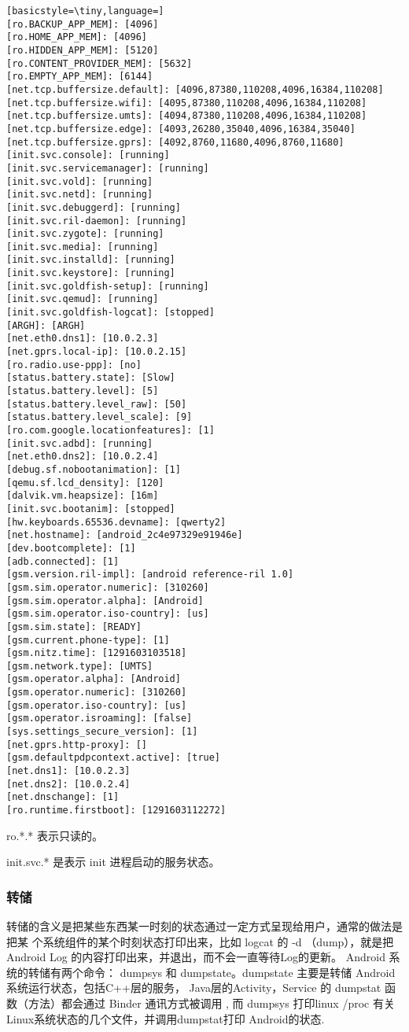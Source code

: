 \documentclass[a4paper,titlepage]{article}
\begin{document}
\begin{multicols}{2}
\begin{lstlisting}[basicstyle=\tiny,language=]
[ro.BACKUP_APP_MEM]: [4096]
[ro.HOME_APP_MEM]: [4096]
[ro.HIDDEN_APP_MEM]: [5120]
[ro.CONTENT_PROVIDER_MEM]: [5632]
[ro.EMPTY_APP_MEM]: [6144]
[net.tcp.buffersize.default]: [4096,87380,110208,4096,16384,110208]
[net.tcp.buffersize.wifi]: [4095,87380,110208,4096,16384,110208]
[net.tcp.buffersize.umts]: [4094,87380,110208,4096,16384,110208]
[net.tcp.buffersize.edge]: [4093,26280,35040,4096,16384,35040]
[net.tcp.buffersize.gprs]: [4092,8760,11680,4096,8760,11680]
[init.svc.console]: [running]
[init.svc.servicemanager]: [running]
[init.svc.vold]: [running]
[init.svc.netd]: [running]
[init.svc.debuggerd]: [running]
[init.svc.ril-daemon]: [running]
[init.svc.zygote]: [running]
[init.svc.media]: [running]
[init.svc.installd]: [running]
[init.svc.keystore]: [running]
[init.svc.goldfish-setup]: [running]
[init.svc.qemud]: [running]
[init.svc.goldfish-logcat]: [stopped]
[ARGH]: [ARGH]
[net.eth0.dns1]: [10.0.2.3]
[net.gprs.local-ip]: [10.0.2.15] 
[ro.radio.use-ppp]: [no]
[status.battery.state]: [Slow]
[status.battery.level]: [5]
[status.battery.level_raw]: [50]
[status.battery.level_scale]: [9]
[ro.com.google.locationfeatures]: [1]
[init.svc.adbd]: [running] 
[net.eth0.dns2]: [10.0.2.4]
[debug.sf.nobootanimation]: [1]
[qemu.sf.lcd_density]: [120]
[dalvik.vm.heapsize]: [16m]
[init.svc.bootanim]: [stopped]
[hw.keyboards.65536.devname]: [qwerty2]
[net.hostname]: [android_2c4e97329e91946e]
[dev.bootcomplete]: [1]
[adb.connected]: [1]
[gsm.version.ril-impl]: [android reference-ril 1.0]
[gsm.sim.operator.numeric]: [310260]
[gsm.sim.operator.alpha]: [Android]
[gsm.sim.operator.iso-country]: [us]
[gsm.sim.state]: [READY]
[gsm.current.phone-type]: [1]
[gsm.nitz.time]: [1291603103518]
[gsm.network.type]: [UMTS]
[gsm.operator.alpha]: [Android]
[gsm.operator.numeric]: [310260]
[gsm.operator.iso-country]: [us]
[gsm.operator.isroaming]: [false]
[sys.settings_secure_version]: [1]
[net.gprs.http-proxy]: []
[gsm.defaultpdpcontext.active]: [true]
[net.dns1]: [10.0.2.3]
[net.dns2]: [10.0.2.4]
[net.dnschange]: [1]
[ro.runtime.firstboot]: [1291603112272]
\end{lstlisting}
\end{multicols}

ro.*.* 表示只读的。 


init.svc.* 是表示 init 进程启动的服务\label{initsvcstat}状态。
\subsubsection{转储}
 转储的含义是把某些东西某一时刻的状态通过一定方式呈现给用户，通常的做法是把某
 个系统组件的某个时刻状态打印出来，比如 logcat 的 -d （dump），就是把 Android
 Log 的内容打印出来，并退出，而不会一直等待Log的更新。
Android 系统的转储有两个命令： dumpsys 和 dumpstate。dumpstate 主要是转储
Android 系统运行状态，包括C++层的服务， Java层的Activity，Service 的 dumpstat
函数（方法）都会通过 Binder 通讯方式被调用 ,
而 dumpsys 打印linux /proc 有关Linux系统状态的几个文件，并调用dumpstat打印 Android的状态.
\end{document}
